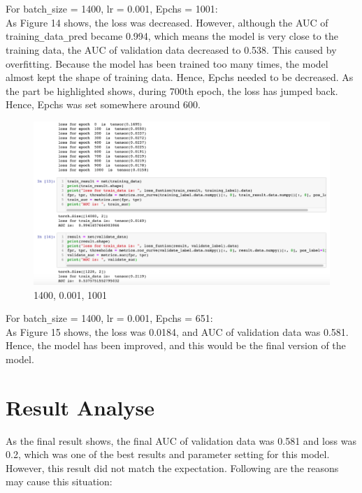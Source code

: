 \documentclass{article}
\begin{document}
For batch\verb+_+size = 1400, lr = 0.001, Epchs = 1001:\\
As Figure 14 shows, the loss was decreased. However, although the AUC of training\verb+_+data\verb+_+pred became 0.994, which means the model is very close to the training data, the AUC of validation data decreased to 0.538. This caused by overfitting. Because the model has been trained too many times, the model almost kept the shape of training data. Hence, Epchs needed to be decreased. As the part be highlighted shows, during 700th epoch, the loss has jumped back. Hence, Epchs was set somewhere around 600.

\begin{figure}[H]
  \centering
  \includegraphics[width=1.0\textwidth]{img/Picture 13}
  \caption{1400, 0.001, 1001}
\end{figure}

For batch\verb+_+size = 1400, lr = 0.001, Epchs = 651:\\
As Figure 15 shows, the loss was 0.0184, and AUC of validation data was 0.581. Hence, the model has been improved, and this would be the final version of the model.

\section{Result Analyse}

As the final result shows, the final AUC of validation data was 0.581 and loss was 0.2, which was one of the best results and parameter setting for this model. However, this result did not match the expectation. Following are the reasons may cause this situation:
\end{document}
